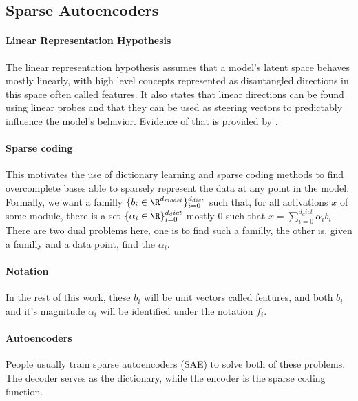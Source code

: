 \documentclass{article}
\begin{document}
\subsection{Sparse Autoencoders}
\label{sec:SAE}

\paragraph{Linear Representation Hypothesis} The linear representation hypothesis assumes that a model's latent space behaves mostly linearly, with high level concepts represented as disantangled directions in this space often called features. It also states that linear directions can be found using linear probes and that they can be used as steering vectors to predictably influence the model's behavior. Evidence of that is provided by \citet{park2023linear, NIPS2013_9aa42b31, pennington2014glove, nanda2023emergent, gurnee2024language, wang2024concept, turner2024activationSteering}.

\paragraph{Sparse coding} This motivates the use of dictionary learning and sparse coding methods to find overcomplete bases able to sparsely represent the data at any point in the model. Formally, we want a familly $\{b_i \in \R^{d_{model}}\}_{i=0}^{d_{dict}}$ such that, for all activations $x$ of some module, there is a set $\{\alpha_i \in \R\}_{i=0}^{d_dict}$ mostly 0 such that $x = \sum_{i=0}^{d_dict} \alpha_i b_i$. There are two dual problems here, one is to find such a familly, the other is, given a familly and a data point, find the $\alpha_i$.

\paragraph{Notation} In the rest of this work, these $b_i$ will be unit vectors called features, and both $b_i$ and it's magnitude $\alpha_i$ will be identified under the notation $f_i$.

\paragraph{Autoencoders} People usually train sparse autoencoders (SAE) \citep{ng2011sparse} to solve both of these problems. The decoder serves as the dictionary, while the encoder is the sparse coding function.
\end{document}
